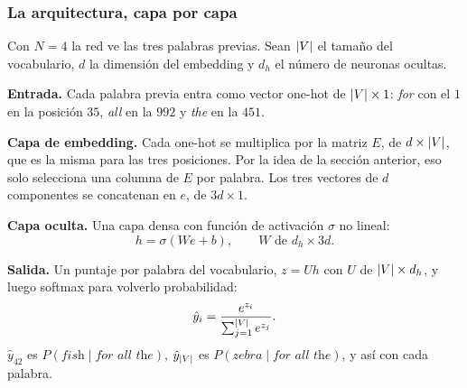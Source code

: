 \documentclass[11pt,letterpaper]{article}
\begin{document}
\subsubsection*{La arquitectura, capa por capa}

\begin{ejemplo}
    Con $N = 4$ la red ve las tres palabras previas. Sean $\left\lvert V \right\rvert$ el
    tamaño del vocabulario, $d$ la dimensión del embedding y $d_h$ el
    número de neuronas ocultas.

    \begin{center}
    \end{center}

    \textbf{Entrada.} Cada palabra previa entra como vector one-hot de
    $\left\lvert V \right\rvert \times 1$: \textit{for} con el $1$ en la posición $35$,
    \textit{all} en la $992$ y \textit{the} en la $451$.

    \textbf{Capa de embedding.} Cada one-hot se multiplica por la
    matriz $E$, de $d \times \left\lvert V \right\rvert$, que es la misma para las tres
    posiciones. Por la idea de la sección anterior, eso solo selecciona
    una columna de $E$ por palabra. Los tres vectores de $d$
    componentes se concatenan en $e$, de $3d \times 1$.

    \textbf{Capa oculta.} Una capa densa con función de activación
    $\sigma$ no lineal:
    \[
        h = \sigma(W e + b) , \qquad W \text{ de } d_h \times 3d .
    \]

    \textbf{Salida.} Un puntaje por palabra del vocabulario,
    $z = U h$ con $U$ de $\left\lvert V \right\rvert \times d_h$, y luego softmax para
    volverlo probabilidad:
    \[
        \hat{y}_i = \frac{e^{z_i}}{\sum_{j=1}^{\left\lvert V \right\rvert} e^{z_j}} .
    \]
    $\hat{y}_{42}$ es $P(\textit{fish} \mid \textit{for all the})$,
    $\hat{y}_{\left\lvert V \right\rvert}$ es $P(\textit{zebra} \mid \textit{for all
    the})$, y así con cada palabra.
\end{ejemplo}
\end{document}
